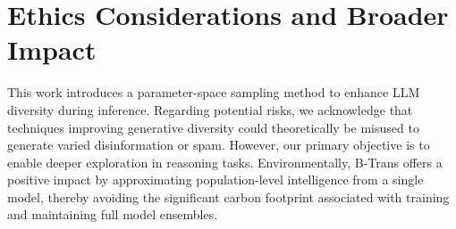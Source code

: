 \documentclass[11pt]{article}
\begin{document}
\section*{Ethics Considerations and Broader Impact}
This work introduces a parameter-space sampling method to enhance LLM diversity during inference. Regarding potential risks, we acknowledge that techniques improving generative diversity could theoretically be misused to generate varied disinformation or spam. However, our primary objective is to enable deeper exploration in reasoning tasks. Environmentally, B-Trans offers a positive impact by approximating population-level intelligence from a single model, thereby avoiding the significant carbon footprint associated with training and maintaining full model ensembles.

%

\end{document}

